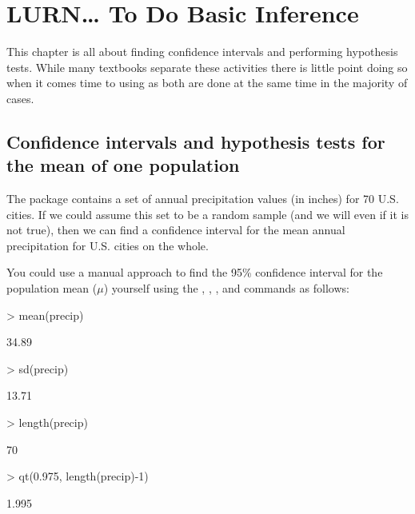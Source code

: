 

\chapter{LURN\ldots{} To Do Basic Inference} 
\label{BasicInference} 
 



 
This chapter is all about finding confidence intervals and performing hypothesis tests. While many textbooks separate these activities there is little point doing so when it comes time to using \R{} as both are done at the same time in the majority of cases. 
 
 
\section{Confidence intervals and hypothesis tests for the mean of one population} 
 
The  package contains a set of annual precipitation values (in inches) for 70 U.S. cities. If we could assume this set to be a random sample (and we will even if it is not true), then we can find a confidence interval for the mean annual precipitation for U.S. cities on the whole. 
 
You could use a manual approach to find the 95\% confidence interval for the population mean ($\mu$) yourself using the , , , and  commands as follows:  

\begin{Schunk}
\begin{Sinput}
> mean(precip) 
\end{Sinput}
\begin{Soutput}
[1] 34.89
\end{Soutput}
\begin{Sinput}
> sd(precip) 
\end{Sinput}
\begin{Soutput}
[1] 13.71
\end{Soutput}
\begin{Sinput}
> length(precip) 
\end{Sinput}
\begin{Soutput}
[1] 70
\end{Soutput}
\begin{Sinput}
> qt(0.975, length(precip)-1) 
\end{Sinput}
\begin{Soutput}
[1] 1.995
\end{Soutput}
\end{Schunk}

